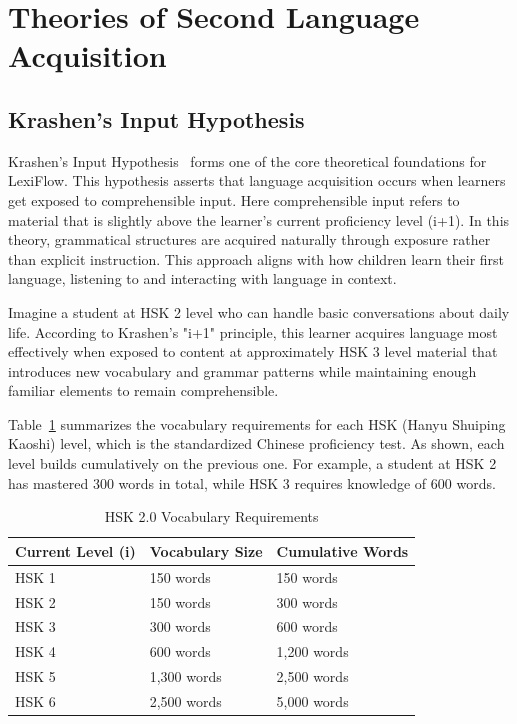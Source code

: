 \documentclass[oneside]{utmthesis}
\begin{document}
\section{Theories of Second Language Acquisition}
\subsection{Krashen's Input Hypothesis}
Krashen's Input Hypothesis~\citep{krashen1985} forms one of the core theoretical foundations for LexiFlow. This hypothesis asserts that language acquisition occurs when learners get exposed to comprehensible input. Here comprehensible input refers to material that is slightly above the learner's current proficiency level (i+1). In this theory, grammatical structures are acquired naturally through exposure rather than explicit instruction. This approach aligns with how children learn their first language, listening to and interacting with language in context.

Imagine a student at HSK 2 level who can handle basic conversations about daily life. According to Krashen's "i+1" principle, this learner acquires language most effectively when exposed to content at approximately HSK 3 level material that introduces new vocabulary and grammar patterns while maintaining enough familiar elements to remain comprehensible.

{Table~{\ref{tab:hsk2}}} summarizes the vocabulary requirements for each HSK (Hanyu Shuiping Kaoshi) level, which is the standardized Chinese proficiency test. As shown, each level builds cumulatively on the previous one. For example, a student at HSK 2 has mastered 300 words in total, while HSK 3 requires knowledge of 600 words.

\begin{table}[h]
    \centering
    \caption{HSK 2.0 Vocabulary Requirements \citep{hsk2}}\label{tab:hsk2}
    \begin{tabular}{@{}lll@{}}
        \toprule
        \textbf{Current Level (i)} & \textbf{Vocabulary Size} & \textbf{Cumulative Words} \\
        \midrule
        HSK 1                      & 150 words                & 150 words                 \\
        HSK 2                      & 150 words                & 300 words                 \\
        HSK 3                      & 300 words                & 600 words                 \\
        HSK 4                      & 600 words                & 1,200 words               \\
        HSK 5                      & 1,300 words              & 2,500 words               \\
        HSK 6                      & 2,500 words              & 5,000 words               \\
        \bottomrule
    \end{tabular}
    \smallskip

\end{table}
\end{document}
